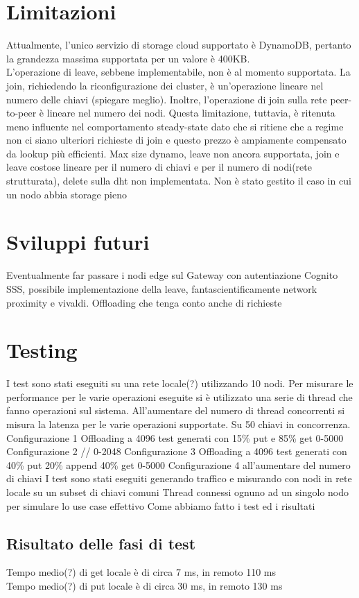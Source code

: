 \documentclass[conference]{IEEEtran}
\begin{document}
\section{Limitazioni}
Attualmente, l'unico servizio di storage cloud supportato è DynamoDB, pertanto la grandezza massima supportata per un valore
è 400KB\cite{dynamo}.\\
L'operazione di leave, sebbene implementabile, non è al momento supportata. La join, richiedendo la riconfigurazione dei cluster,
è un'operazione lineare nel numero delle chiavi (spiegare meglio). Inoltre, l'operazione di join sulla rete peer-to-peer
è lineare nel numero dei nodi. Questa limitazione, tuttavia, è ritenuta meno influente nel comportamento steady-state dato
che si ritiene che a regime non ci siano ulteriori richieste di join e questo prezzo è ampiamente compensato da lookup più efficienti.
Max size dynamo, leave non ancora supportata, join e leave costose lineare per il numero di chiavi e per il numero di nodi(rete strutturata),
delete sulla dht non implementata. Non è stato gestito il caso in cui un nodo abbia storage pieno
\section{Sviluppi futuri}
Eventualmente far passare i nodi edge sul Gateway con autentiazione Cognito
SSS, possibile implementazione della leave, fantascientificamente network proximity e vivaldi. Offloading che tenga conto anche di richieste
\section{Testing}
I test sono stati eseguiti su una rete locale(?) utilizzando 10 nodi. Per misurare le performance per le varie operazioni eseguite si è utilizzato
una serie di thread che fanno operazioni sul sistema. All'aumentare del numero di thread concorrenti si misura la latenza per le varie operazioni supportate.
Su 50 chiavi in concorrenza.
Configurazione 1 Offloading a 4096 test generati con 15\% put e 85\% get 0-5000
Configurazione 2 // 0-2048
Configurazione 3 Offloading a 4096 test generati con 40\% put 20\% append 40\% get 0-5000
Configurazione 4 all'aumentare del numero di chiavi
I test sono stati eseguiti generando traffico e misurando con nodi in rete locale su un subset di chiavi comuni
Thread connessi ognuno ad un singolo nodo per simulare lo use case effettivo
Come abbiamo fatto i test ed i risultati
\subsection{Risultato delle fasi di test}
Tempo medio(?) di get locale è di circa 7 ms, in remoto 110 ms\\
Tempo medio(?) di put locale è di circa 30 ms, in remoto 130 ms\\
\end{document}
